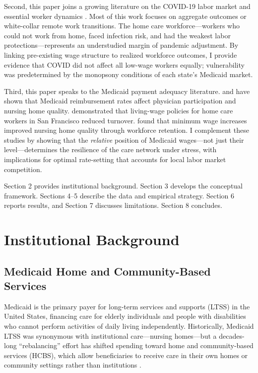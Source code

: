 \documentclass[12pt]{article}
\begin{document}
Second, this paper joins a growing literature on the COVID-19 labor market and essential worker dynamics \citep{chetty2020how, coibion2020labor, barrero2021covid}. Most of this work focuses on aggregate outcomes or white-collar remote work transitions. The home care workforce---workers who could not work from home, faced infection risk, and had the weakest labor protections---represents an understudied margin of pandemic adjustment. By linking pre-existing wage structure to realized workforce outcomes, I provide evidence that COVID did not affect all low-wage workers equally; vulnerability was predetermined by the monopsony conditions of each state's Medicaid market.

Third, this paper speaks to the Medicaid payment adequacy literature. \citet{clemens2014bargaining} and \citet{grabowski2008medicaid} have shown that Medicaid reimbursement rates affect physician participation and nursing home quality. \citet{howes2005living} demonstrated that living-wage policies for home care workers in San Francisco reduced turnover. \citet{ruffini2022worker} found that minimum wage increases improved nursing home quality through workforce retention. I complement these studies by showing that the \textit{relative} position of Medicaid wages---not just their level---determines the resilience of the care network under stress, with implications for optimal rate-setting that accounts for local labor market competition.

Section 2 provides institutional background. Section 3 develops the conceptual framework. Sections 4--5 describe the data and empirical strategy. Section 6 reports results, and Section 7 discusses limitations. Section 8 concludes.


\section{Institutional Background}

\subsection{Medicaid Home and Community-Based Services}

Medicaid is the primary payer for long-term services and supports (LTSS) in the United States, financing care for elderly individuals and people with disabilities who cannot perform activities of daily living independently. Historically, Medicaid LTSS was synonymous with institutional care---nursing homes---but a decades-long ``rebalancing'' effort has shifted spending toward home and community-based services (HCBS), which allow beneficiaries to receive care in their own homes or community settings rather than institutions \citep{macpac2022medicaid}.
\end{document}
